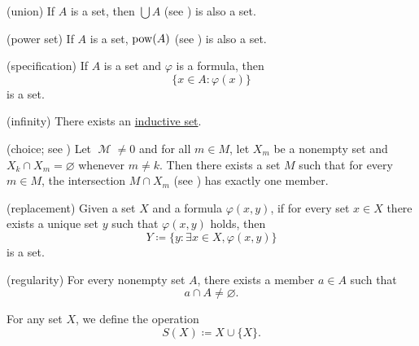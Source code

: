 \begin{definition}
\begin{thmenum}
    (union) If \( A \) is a set, then \( \bigcup A \) (see ) is also a set.

    (power set) If \( A \) is a set, \( \operatorname{pow}(A) \) (see ) is also a set.

    (specification) If \( A \) is a set and \( \varphi \) is a formula, then
    \begin{equation*}
      \{ x \in A \colon \varphi(x) \}
    \end{equation*}
    is a set.

    (infinity) There exists an \hyperref[def:inductive_set]{inductive set}.

    (choice; see ) Let \( \mscrM \neq 0 \) and for all \( m \in M \), let \( X_m \) be a nonempty set and \( X_k \cap X_m = \varnothing \) whenever \( m \neq k \). Then there exists a set \( M \) such that for every \( m \in M \), the intersection \( M \cap X_m \) (see ) has exactly one member.

    (replacement) Given a set \( X \) and a formula \( \varphi(x, y) \), if for every set \( x \in X \) there exists a unique set \( y \) such that \( \varphi(x, y) \) holds, then
    \begin{equation*}
      Y \coloneqq \{ y \colon \exists x \in X, \varphi(x, y) \}
    \end{equation*}
    is a set.

    (regularity) For every nonempty set \( A \), there exists a member \( a \in A \) such that
    \begin{equation*}
      a \cap A \neq \varnothing.
    \end{equation*}
  \end{thmenum}
\end{definition}

\begin{proposition}\label{thm:zfc_no_set_is_member_of_itself}
\end{proposition}

\begin{definition}\label{def:ordinal_successor_operator}
  For any set \( X \), we define the  operation
  \begin{equation*}
    S(X) \coloneqq X \cup \{ X \}.
  \end{equation*}
\end{definition}

